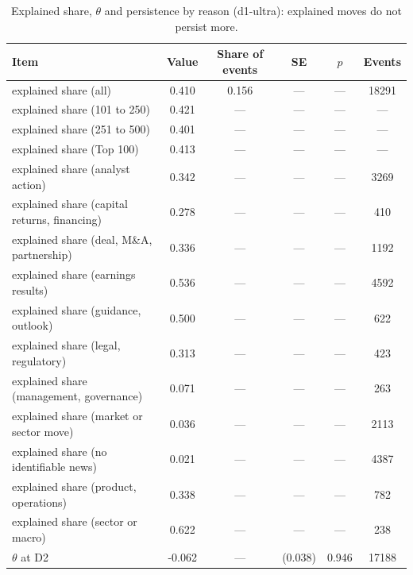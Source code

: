 \begin{table}[htbp]
\centering
\small
\begin{threeparttable}
\caption{Explained share, $\theta$ and persistence by reason (d1-ultra): explained moves do not persist more.}\label{tab:a-explanation-share-theta}
\begin{tabular}{@{}lS[table-format=-1.3]S[table-format=1.3]S[table-format=1.3, table-space-text-pre=(, table-space-text-post=)]S[table-format=1.3]S[table-format=5.0]@{}}
\toprule
Item & {Value} & {Share of events} & {SE} & {$p$} & {Events} \\
\midrule
explained share (all) & 0.410 & 0.156 & {---} & {---} & 18291 \\
explained share (101 to 250) & 0.421 & {---} & {---} & {---} & {---} \\
explained share (251 to 500) & 0.401 & {---} & {---} & {---} & {---} \\
explained share (Top 100) & 0.413 & {---} & {---} & {---} & {---} \\
explained share (analyst action) & 0.342 & {---} & {---} & {---} & 3269 \\
explained share (capital returns, financing) & 0.278 & {---} & {---} & {---} & 410 \\
explained share (deal, M\&A, partnership) & 0.336 & {---} & {---} & {---} & 1192 \\
explained share (earnings results) & 0.536 & {---} & {---} & {---} & 4592 \\
explained share (guidance, outlook) & 0.500 & {---} & {---} & {---} & 622 \\
explained share (legal, regulatory) & 0.313 & {---} & {---} & {---} & 423 \\
explained share (management, governance) & 0.071 & {---} & {---} & {---} & 263 \\
explained share (market or sector move) & 0.036 & {---} & {---} & {---} & 2113 \\
explained share (no identifiable news) & 0.021 & {---} & {---} & {---} & 4387 \\
explained share (product, operations) & 0.338 & {---} & {---} & {---} & 782 \\
explained share (sector or macro) & 0.622 & {---} & {---} & {---} & 238 \\
$\theta$ at D2 & -0.062 & {---} & {(}0.038{)} & 0.946 & 17188 \\

\end{tabular}
\end{threeparttable}
\end{table}
